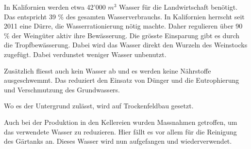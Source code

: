 In Kalifornien werden etwa 42'000 $m^3$ Wasser für die Landwirtschaft benötigt. Das entspricht  39 \% des gesamten Wasserverbrauchs. 
In Kalifornien herrscht seit 2011 eine Dürre, die Wasserrationierung nötig machte. Daher regulieren über 90 \% der
Weingüter aktiv ihre Bewässerung. Die grösste Einsparung gibt es durch die Tropfbewässerung. Dabei wird das Wasser direkt den Wurzeln  des Weinstocks zugefügt. Dabei verdunstet weniger Wasser unbenutzt.

Zusätzlich fliesst auch kein Wasser ab und es werden keine Nährstoffe ausgeschwemmt. Das reduziert
den Einsatz von Dünger und die Eutrophierung und Verschmutzung des Grundwassers.

Wo es der Untergrund zulässt, wird auf Trockenfeldbau gesetzt.

\cite{_2015_report_appendix.pdf}


Auch bei der Produktion in den Kellereien wurden Massnahmen getroffen, um das verwendete Wasser zu reduzieren. Hier fällt es vor allem für die Reinigung des Gärtanks an. Dieses Wasser wird nun
aufgefangen und wiederverwendet.

